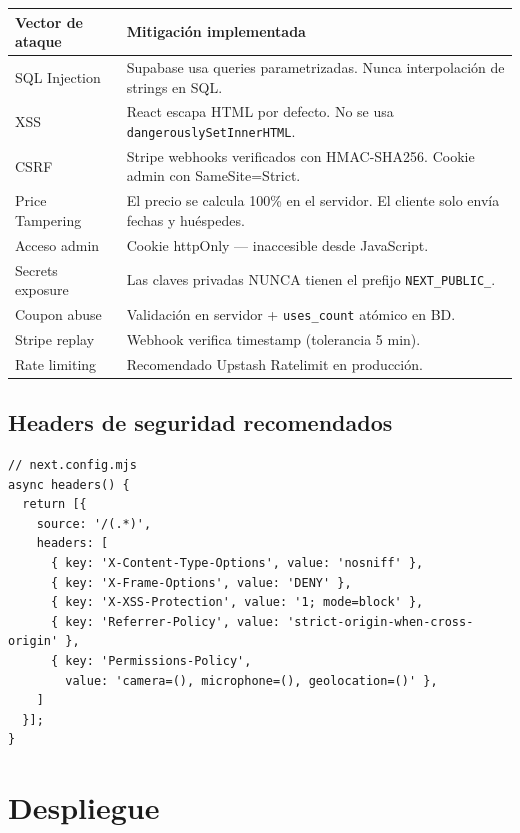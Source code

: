 \documentclass[12pt,a4paper,twoside,openright]{report}
\begin{document}
\begin{longtable}{L{4.5cm} L{8cm}}
  \toprule
  \textbf{Vector de ataque} & \textbf{Mitigación implementada} \\
  \midrule
  SQL Injection & Supabase usa queries parametrizadas. Nunca interpolación de strings en SQL. \\
  \addlinespace
  XSS & React escapa HTML por defecto. No se usa \texttt{dangerouslySetInnerHTML}. \\
  \addlinespace
  CSRF & Stripe webhooks verificados con HMAC-SHA256. Cookie admin con SameSite=Strict. \\
  \addlinespace
  Price Tampering & El precio se calcula 100\% en el servidor. El cliente solo envía fechas y huéspedes. \\
  \addlinespace
  Acceso admin & Cookie httpOnly — inaccesible desde JavaScript. \\
  \addlinespace
  Secrets exposure & Las claves privadas NUNCA tienen el prefijo \texttt{NEXT\_PUBLIC\_}. \\
  \addlinespace
  Coupon abuse & Validación en servidor + \texttt{uses\_count} atómico en BD. \\
  \addlinespace
  Stripe replay & Webhook verifica timestamp (tolerancia 5 min). \\
  \addlinespace
  Rate limiting & Recomendado Upstash Ratelimit en producción. \\
  \bottomrule
\end{longtable}

\section{Headers de seguridad recomendados}

\begin{lstlisting}[style=tsStyle]
// next.config.mjs
async headers() {
  return [{
    source: '/(.*)',
    headers: [
      { key: 'X-Content-Type-Options', value: 'nosniff' },
      { key: 'X-Frame-Options', value: 'DENY' },
      { key: 'X-XSS-Protection', value: '1; mode=block' },
      { key: 'Referrer-Policy', value: 'strict-origin-when-cross-origin' },
      { key: 'Permissions-Policy',
        value: 'camera=(), microphone=(), geolocation=()' },
    ]
  }];
}
\end{lstlisting}

\chapter{Despliegue}
\end{document}
